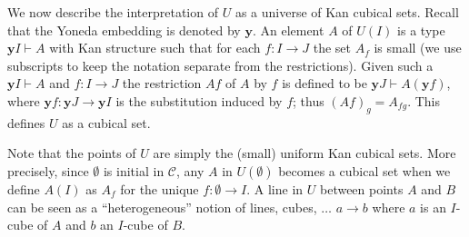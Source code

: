 \documentclass[10pt,a4paper]{article}
\newcommand{\CC}{{\mathcal C}}
\newcommand{\es}{\emptyset}
\newcommand{\rup}[1]{#1{\uparrow}}
\newcommand{\rdo}[1]{#1{\downarrow}}
\newcommand{\OO}{O}
\newcommand{\yoneda}{\mathbf{y}}
\begin{document}


We now describe the interpretation of $U$ as a universe of Kan cubical
sets. Recall that the Yoneda embedding is denoted by $\yoneda$.  An
element $A$ of $U(I)$ is a type $\yoneda I \vdash A$ with Kan
structure such that for each $f \colon I \to J$ the set $A_f$ is small
(we use subscripts to keep the notation separate from the
restrictions).  Given such a $\yoneda I \vdash A$ and $f \colon I \to
J$ the restriction $A f$ of $A$ by $f$ is defined to be $\yoneda J
\vdash A (\yoneda f)$, where $\yoneda f \colon \yoneda J \to \yoneda
I$ is the substitution induced by $f$; thus $(A f)_g = A_{f g}$.  This
defines $U$ as a cubical set.


Note that the points of $U$ are simply the (small) uniform Kan cubical
sets. More precisely, since $\es$ is initial in $\CC$,
any $A$ in $U(\es)$ becomes a cubical set when we define
$A(I)$ as $A_f$ for the unique $f:\es\to I$.
 A line in $U$ between points $A$ and $B$ can be seen as a
``heterogeneous'' notion of lines, cubes, $\dots$ $a\to b$
where $a$ is an $I$-cube of $A$ and $b$ an $I$-cube of $B$.
\end{document}
